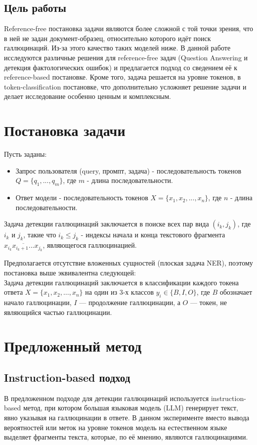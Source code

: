 \documentclass[12pt]{article}
\begin{document}
\subsection{Цель работы}
Reference-free постановка задачи являются более сложной с той точки зрения, что в ней не задан документ-образец, относительно которого идёт поиск галлюцинаций. Из-за этого качество таких моделей ниже. В данной работе исследуются различные решения для reference-free задач (Question Answering и детекция фактологических ошибок) и предлагается подход со сведением её к reference-based постановке. Кроме того, задача решается на уровне токенов, в token-classification постановке, что дополнительно усложняет решение задачи и делает исследование особенно ценным и комплексным.

 
\section{Постановка задачи}

Пусть заданы:
\begin{itemize}
    \item Запрос пользователя (query, промпт, задача) - последовательность токенов $Q = \{q_1,...,q_m\}$, где $m$ - длина последовательности.
    \item Ответ модели - последовательность токенов $X = \{x_1, x_2, . . . , x_n\}$, где $n$ - длина последовательности.
\end{itemize} 
Задача детекции галлюцинаций заключается в поиске всех пар вида $(i_k , j_k)$, где $i_k$ и $j_k$, такие что $i_k \leqslant j_k$ - индексы начала и конца текстового фрагмента $\overline{x_{i_k}x_{i_k+1}...x_{j_k}}$, являющегося галлюцинацией.

Предполагается отсутствие вложенных сущностей (плоская задача NER), поэтому постановка выше эквивалентна следующей: 
\\
Задача детекции галлюцинаций заключается в классификации каждого токена ответа \( X = \{x_1, x_2, \ldots, x_n\} \) на один из 3-х классов \( y_i \in \{B, I, O\} \), где \( B \) обозначает начало галлюцинации, \( I \) — продолжение галлюцинации, а \( O \) — токен, не являющийся частью галлюцинации.

 
\section{Предложенный метод}
\subsection{Instruction-based подход}
В предложенном подходе для детекции галлюцинаций используется instruction-based метод, при котором большая языковая модель (LLM) генерирует текст, явно указывая на галлюцинации в ответе. В данном эксперименте вместо вывода вероятностей или меток на уровне токенов модель на естественном языке выделяет фрагменты текста, которые, по её мнению, являются галлюцинациями.
\end{document}
